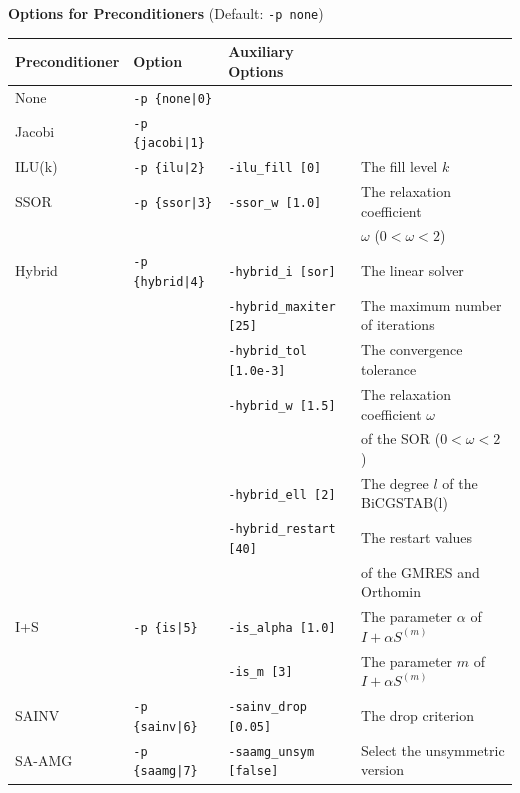 \documentclass[a4paper]{article}
\begin{document}
\begin{minipage}[t]{\textwidth}
\begin{center}
{\bf Options for Preconditioners} (Default: \verb=-p none=)\\
\begin{tabular}{l|lll}\hline\hline
Preconditioner   & Option           & Auxiliary Options \\ \hline
None     & \verb=-p {none|0}=    &   \\
Jacobi   & \verb=-p {jacobi|1}=  &     \\
ILU(k)   & \verb=-p {ilu|2}=     & \verb=-ilu_fill [0]=        & The fill level $k$ \\
SSOR     & \verb=-p {ssor|3}=    & \verb=-ssor_w [1.0]=        & The relaxation coefficient \\ 
         &                       &                             & $\omega$ ($0<\omega<2$) \\
Hybrid   & \verb=-p {hybrid|4}=  & \verb=-hybrid_i [sor]=      & The linear solver\\
         &                       & \verb=-hybrid_maxiter [25]= & The maximum number of iterations \\
         &                       & \verb=-hybrid_tol [1.0e-3]= & The convergence tolerance \\
         &                       & \verb=-hybrid_w [1.5]=      & The relaxation coefficient $\omega$ \\
         &                       &                             & of the SOR ($0<\omega<2$) \\
         &                       & \verb=-hybrid_ell [2]=      & The degree $l$ of the BiCGSTAB(l) \\
         &                       & \verb=-hybrid_restart [40]= & The restart values \\
         &                       &                             & of the GMRES and Orthomin \\
I+S      & \verb=-p {is|5}=      & \verb=-is_alpha [1.0]=      & The parameter $\alpha$ of $I+\alpha S^{(m)}$ \\
         &                       & \verb=-is_m [3]=            & The parameter $m$ of $I+\alpha S^{(m)}$ \\
SAINV    & \verb=-p {sainv|6}=   & \verb=-sainv_drop [0.05]=   & The drop criterion\\
SA-AMG   & \verb=-p {saamg|7}=   & \verb=-saamg_unsym [false]= & Select the unsymmetric version    \\

\end{tabular}
\end{center}
\end{minipage}
\end{document}
